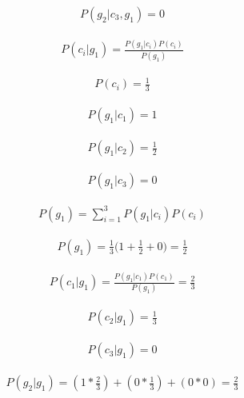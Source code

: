 \documentclass[12pt]{article}
\begin{document}
\begin{gather}
P(g_2|c_3,g_1) = 0
\end{gather}

\begin{gather}
P(c_i|g_1) = \frac{P(g_1|c_i) P(c_i)}{P(g_1)}
\end{gather}

\begin{gather}
P(c_i) = \frac{1}{3}
\end{gather}

\begin{gather}
P(g_1|c_1) = 1
\end{gather}

\begin{gather}
P(g_1|c_2) = \frac{1}{2}
\end{gather}

\begin{gather}
P(g_1|c_3) = 0
\end{gather}

\begin{gather}
P(g_1) = \sum_{i=1}^{3} P(g_1|c_i)P(c_i)
\end{gather}

\begin{gather}
P(g_1) = \frac{1}{3}\Big(1 + \frac{1}{2} + 0\Big) = \frac{1}{2}
\end{gather}

\begin{gather}
P(c_1|g_1) = \frac{P(g_1|c_1) P(c_1)}{P(g_1)} = \frac{2}{3}
\end{gather}

\begin{gather}
P(c_2|g_1) = \frac{1}{3}
\end{gather}

\begin{gather}
P(c_3|g_1) = 0
\end{gather}

\begin{gather}
P(g_2|g_1) = (1 * \frac{2}{3}) + (0 * \frac{1}{3}) + (0 * 0) = \frac{2}{3}
\end{gather}
\end{document}

